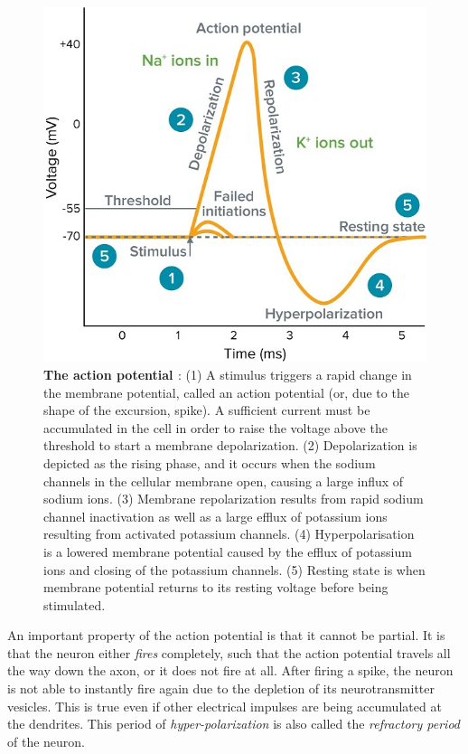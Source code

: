 \begin{figure}[ht!]
  \centering
  \includegraphics[width=.5\linewidth]{src/pic/what-is-action-potential.jpg}
  \caption{\textbf{The action potential \citep[taken from][]{what-action-potential}}: (1) A stimulus triggers a rapid change in the membrane potential, called an action potential (or, due to the shape of the excursion, spike). A sufficient current must be accumulated in the cell in order to raise the voltage above the threshold to start a membrane depolarization. (2) Depolarization is depicted as the rising phase, and it occurs when the sodium channels in the cellular membrane open, causing a large influx of sodium ions. (3) Membrane repolarization results from rapid sodium channel inactivation as well as a large efflux of potassium ions resulting from activated potassium channels. (4) Hyperpolarisation is a lowered membrane potential caused by the efflux of potassium ions and closing of the potassium channels. (5) Resting state is when membrane potential returns to its resting voltage before being stimulated.}
  \label{fig:action_potential}
\end{figure}


An important property of the action potential is that it cannot be partial. It is that the neuron either \emph{fires} completely, such that the action potential travels all the way down the axon, or it does not fire at all. After firing a spike, the neuron is not able to instantly fire again due to the depletion of its neurotransmitter vesicles. This is true even if other electrical impulses are being accumulated at the dendrites. This period of \emph{hyper-polarization} is also called the \emph{refractory period} of the neuron.

